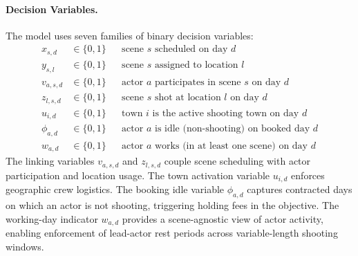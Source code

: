 \paragraph{Decision Variables.}
The model uses seven families of binary decision variables:
\begin{align}
x_{s,d} &\in \{0,1\} && \text{scene } s \text{ scheduled on day } d \label{var:x}\\
y_{s,l} &\in \{0,1\} && \text{scene } s \text{ assigned to location } l \label{var:y}\\
v_{a,s,d} &\in \{0,1\} && \text{actor } a \text{ participates in scene } s \text{ on day } d \label{var:v}\\
z_{l,s,d} &\in \{0,1\} && \text{scene } s \text{ shot at location } l \text{ on day } d \label{var:z}\\
u_{i,d} &\in \{0,1\} && \text{town } i \text{ is the active shooting town on day } d \label{var:u}\\
\phi_{a,d} &\in \{0,1\} && \text{actor } a \text{ is idle (non-shooting) on booked day } d \label{var:phi}\\
w_{a,d} &\in \{0,1\} && \text{actor } a \text{ works (in at least one scene) on day } d \label{var:w}
\end{align}
The linking variables $v_{a,s,d}$ and $z_{l,s,d}$ couple scene scheduling with actor participation and location usage.
The town activation variable $u_{i,d}$ enforces geographic crew logistics.
The booking idle variable $\phi_{a,d}$ captures contracted days on which an actor is not shooting, triggering holding fees in the objective.
The working-day indicator $w_{a,d}$ provides a scene-agnostic view of actor activity, enabling enforcement of lead-actor rest periods across variable-length shooting windows.

